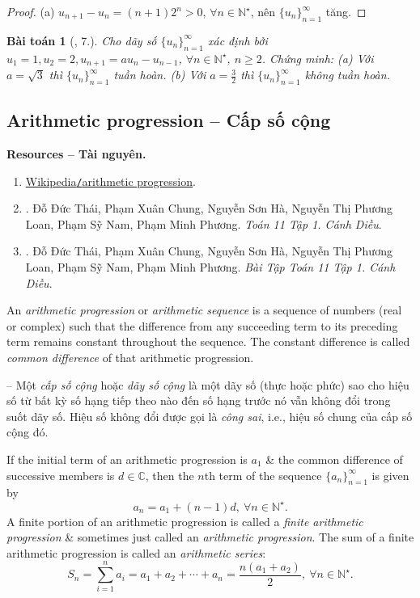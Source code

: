 \documentclass[oneside]{book}
\newtheorem{baitoan}{Bài toán}
\begin{document}
\begin{proof}
	(a) $u_{n+1} - u_n = (n + 1)2^n > 0$, $\forall n\in\mathbb{N}^\star$, nên $\{u_n\}_{n=1}^\infty$ tăng.
\end{proof}

\begin{baitoan}[\cite{TLCT_dai_so_giai_tich_11}, 7.]
	Cho dãy số $\{u_n\}_{n=1}^\infty$ xác định bởi $u_1 = 1,u_2 = 2,u_{n+1} = au_n - u_{n-1}$, $\forall n\in\mathbb{N}^\star$, $n\ge2$. Chứng minh: (a) Với $a = \sqrt{3}$ thì $\{u_n\}_{n=1}^\infty$ tuần hoàn. (b) Với $a = \frac{3}{2}$ thì $\{u_n\}_{n=1}^\infty$ không tuần hoàn.
\end{baitoan}


\subsection{Arithmetic progression -- Cấp số cộng}
\textbf{\textsf{Resources -- Tài nguyên.}}
\begin{enumerate}
	\item \href{https://en.wikipedia.org/wiki/Arithmetic_progression}{Wikipedia{\tt/}arithmetic progression}.
	\item \cite{SGK_Toan_11_CD_tap_1}. {\sc Đỗ Đức Thái, Phạm Xuân Chung, Nguyễn Sơn Hà, Nguyễn Thị Phương Loan, Phạm Sỹ Nam, Phạm Minh Phương}. {\it Toán 11 Tập 1. Cánh Diều}.
	\item \cite{SBT_Toan_11_CD_tap_1}. {\sc Đỗ Đức Thái, Phạm Xuân Chung, Nguyễn Sơn Hà, Nguyễn Thị Phương Loan, Phạm Sỹ Nam, Phạm Minh Phương}. {\it Bài Tập Toán 11 Tập 1. Cánh Diều}.
\end{enumerate}
An {\it arithmetic progression} or {\it arithmetic sequence} is a sequence of numbers (real or complex) such that the difference from any succeeding term to its preceding term remains constant throughout the sequence. The constant difference is called {\it common difference} of that arithmetic progression.

-- Một {\it cấp số cộng} hoặc {\it dãy số cộng} là một dãy số (thực hoặc phức) sao cho hiệu số từ bất kỳ số hạng tiếp theo nào đến số hạng trước nó vẫn không đổi trong suốt dãy số. Hiệu số không đổi được gọi là {\it  công sai}, i.e., hiệu số chung của cấp số cộng đó.

If the initial term of an arithmetic progression is $a_1$ \& the common difference of successive members is $d\in\mathbb{C}$, then the $n$th term of the sequence $\{a_n\}_{n=1}^\infty$ is given by
\begin{equation*}
	a_n = a_1 + (n - 1)d,\ \forall n\in\mathbb{N}^\star.
\end{equation*}
A finite portion of an arithmetic progression is called a {\it finite arithmetic progression} \& sometimes just called an {\it arithmetic progression}. The sum of a finite arithmetic progression is called an {\it arithmetic series}:
\begin{equation*}
	S_n = \sum_{i=1}^n a_i = a_1 + a_2 + \cdots + a_n = \frac{n(a_1 + a_2)}{2},\ \forall n\in\mathbb{N}^\star.
\end{equation*}
\end{document}

